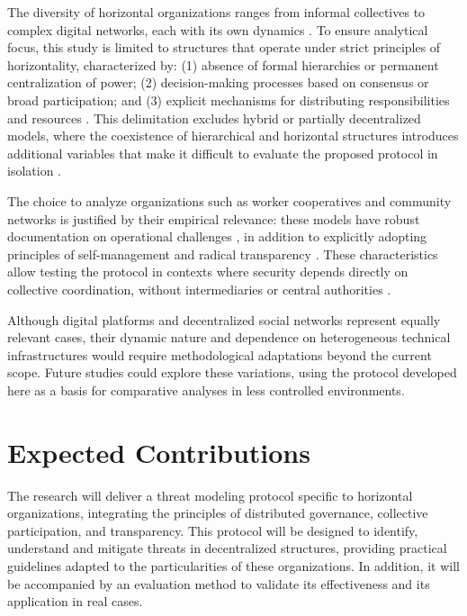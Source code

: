 The diversity of horizontal organizations ranges from informal collectives to
complex digital networks, each with its own dynamics \cite{EverydayRevolutions}.
To ensure analytical focus, this study is limited to structures that operate
under strict principles of horizontality, characterized by: (1) absence of
formal hierarchies or permanent centralization of power; (2) decision-making
processes based on consensus or broad participation; and (3) explicit mechanisms
for distributing responsibilities and resources \cite{Colbac}. This delimitation
excludes hybrid or partially decentralized models, where the coexistence of
hierarchical and horizontal structures introduces additional variables that make
it difficult to evaluate the proposed protocol in isolation
\cite{Non-HierarchicalForms}.

The choice to analyze organizations such as worker cooperatives and community
networks is justified by their empirical relevance: these models have robust
documentation on operational challenges \cite{WorkerCooperativesinAmerica}, in
addition to explicitly adopting principles of self-management and radical
transparency \cite{EverydayRevolutions}. These characteristics allow testing the
protocol in contexts where security depends directly on collective coordination,
without intermediaries or central authorities
\cite{ThreatModelingdesigningForSecurity}.

Although digital platforms and decentralized social networks
\cite{CreatingTheCollectiveSocialMedia} represent equally relevant cases, their
dynamic nature and dependence on heterogeneous technical infrastructures would
require methodological adaptations beyond the current scope. Future studies
could explore these variations, using the protocol developed here as a basis for
comparative analyses in less controlled environments.


\section{Expected Contributions}
\label{sec:expected_contributions}

The research will deliver a threat modeling protocol specific to horizontal
organizations, integrating the principles of distributed governance, collective
participation, and transparency. This protocol will be designed to
identify, understand and mitigate threats in decentralized structures, providing
practical guidelines adapted to the particularities of these organizations. In
addition, it will be accompanied by an evaluation method to validate its
effectiveness and its application in real cases.

